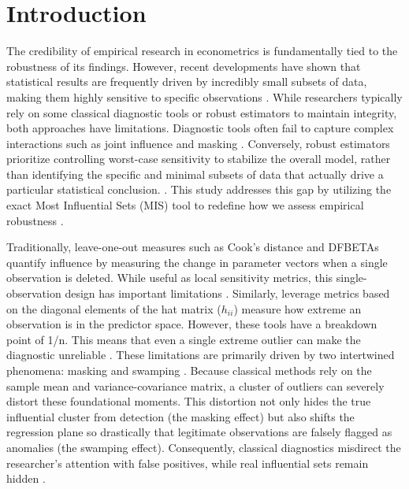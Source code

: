 \documentclass[../main.tex]{subfiles}
\begin{document}
\section{Introduction}
\label{sec:introduction}
The credibility of empirical research in econometrics is fundamentally tied to the robustness of its findings. However, recent developments have shown that statistical results are frequently driven by incredibly small subsets of data, making them highly sensitive to specific observations \parencite{broderick2020automatic}. While researchers typically rely on some classical diagnostic tools or robust estimators to maintain integrity, both approaches have limitations. Diagnostic tools often fail to capture complex interactions such as joint influence and masking \parencite{chatterjee1986influential, rousseeuw1990unmasking}. Conversely, robust estimators prioritize controlling worst-case sensitivity to stabilize the overall model, rather than identifying the specific and minimal subsets of data that actually drive a particular statistical conclusion. \parencite{hampel1974influence}.
This study addresses this gap by utilizing the exact Most Influential Sets (MIS) tool to redefine how we assess empirical robustness \parencite{kuschnig2021hidden}.

Traditionally, leave-one-out measures such as Cook's distance and DFBETAs quantify influence by measuring the change in parameter vectors when a single observation is deleted. While useful as local sensitivity metrics, this single-observation design has important limitations \parencite{cook2000detection}. Similarly, leverage metrics based on the diagonal elements of the hat matrix ($h_{ii}$) measure how extreme an observation is in the predictor space. However, these tools have a breakdown point of 1/n. This means that even a single extreme outlier can make the diagnostic unreliable \parencite{rousseeuw2003robust}. These limitations are primarily driven by two intertwined phenomena: masking and swamping \parencite{hadi1993procedures}. Because classical methods rely on the sample mean and variance-covariance matrix, a cluster of outliers can severely distort these foundational moments. This distortion not only hides the true influential cluster from detection (the masking effect) but also shifts the regression plane so drastically that legitimate observations are falsely flagged as anomalies (the swamping effect). Consequently, classical diagnostics misdirect the researcher's attention with false positives, while real influential sets remain hidden \parencite{zhao2019multiple, rousseeuw1990unmasking}.
\end{document}
